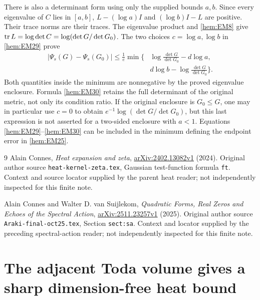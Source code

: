 There is also a determinant form using only the supplied bounds
\(a,b\). Since every eigenvalue of \(C\) lies in \([a,b]\),
\(L-(\log a)I\) and \((\log b)I-L\) are positive. Their trace norms
are their traces. The eigenvalue product and \eqref{hem:EM8} give
\(\operatorname{tr} L=\log\det C=\log(\det G/\det G_0)\). The two choices
\(c=\log a,\log b\) in \eqref{hem:EM29} prove
\begin{equation}
 \begin{split}
 |\Psi_s(G)-\Psi_s(G_0)|\le\frac1e\min\biggl\{
 &\log\frac{\det G}{\det G_0}-d\log a,\\
 &d\log b-\log\frac{\det G}{\det G_0}\biggr\}.
 \end{split}
 \tag{EM30}\label{hem:EM30}
\end{equation}
Both quantities inside the minimum are nonnegative by the proved
eigenvalue enclosure. Formula \eqref{hem:EM30} retains the full determinant
of the original metric, not only its condition ratio. If the original
enclosure is \(G_0\le G\), one may in particular use \(c=0\) to obtain
\(e^{-1}\log(\det G/\det G_0)\), but this last expression is not asserted
for a two-sided enclosure with \(a<1\).
Equations \eqref{hem:EM29}--\eqref{hem:EM30} can be included in the minimum
defining the endpoint error in \eqref{hem:EM25}.

\begin{thebibliography}{9}
Alain Connes, \emph{Heat expansion and zeta},
\href{https://arxiv.org/abs/2402.13082v1}{arXiv:2402.13082v1} (2024).
Original author source \texttt{heat-kernel-zeta.tex}, Gaussian test-function
formula \texttt{ft}. Context and source locator supplied by the parent
heat reader; not independently inspected for this finite note.

Alain Connes and Walter D. van Suijlekom,
\emph{Quadratic Forms, Real Zeros and Echoes of the Spectral Action},
\href{https://arxiv.org/abs/2511.23257v1}{arXiv:2511.23257v1} (2025).
Original author source \texttt{Araki-final-oct25.tex},
Section \texttt{sect:sa}. Context and locator supplied by the preceding
spectral-action reader; not independently inspected for this finite note.
\end{thebibliography}

\endgroup

\clearpage\begingroup
\part*{The adjacent Toda volume gives a sharp dimension-free heat bound}
\newcommand{\hvhC}{\mathbb C}\newcommand{\hvhR}{\mathbb R}
\newcommand{\hvhtr}{\operatorname{tr}}\newcommand{\hvhnorm}[1]{\left\lVert#1\right\rVert}
\newtheorem{hvhtheorem}{Theorem}


